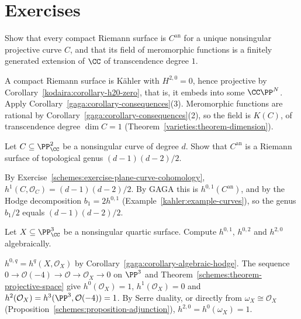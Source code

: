 \section{Exercises}\label{gaga:section-exercises}

\begin{exercise}\label{gaga:exercise-riemann-surfaces-algebraic}
Show that every compact Riemann surface is $C^{\mathrm{an}}$ for a unique nonsingular projective curve $C$, and that its field of meromorphic functions is a finitely
generated extension of $\CC$ of transcendence degree $1$.
\end{exercise}

\begin{solution}
A compact Riemann surface is K\"ahler with $H^{2,0} = 0$, hence projective by Corollary~\ref{kodaira:corollary-h20-zero}, that is, it embeds into some $\CC\PP^N$.
Apply Corollary~\ref{gaga:corollary-consequences}(3). Meromorphic functions are rational by Corollary~\ref{gaga:corollary-consequences}(2), so the field is $K(C)$, of
transcendence degree $\dim C = 1$ (Theorem~\ref{varieties:theorem-dimension}).
\end{solution}

\begin{exercise}\label{gaga:exercise-genus-plane-curve}
Let $C \subseteq \PP^2_\CC$ be a nonsingular curve of degree $d$. Show that $C^{\mathrm{an}}$ is a Riemann surface of topological genus $(d-1)(d-2)/2$.
\end{exercise}

\begin{solution}
By Exercise~\ref{schemes:exercise-plane-curve-cohomology}, $h^1(C, \mathcal{O}_C) = (d-1)(d-2)/2$. By GAGA this is $h^{0,1}(C^{\mathrm{an}})$, and by the Hodge
decomposition $b_1 = 2h^{0,1}$ (Example~\ref{kahler:example-curves}), so the genus $b_1/2$ equals $(d-1)(d-2)/2$.
\end{solution}

\begin{exercise}\label{gaga:exercise-hodge-numbers-hypersurface}
Let $X \subseteq \PP^3_\CC$ be a nonsingular quartic surface. Compute $h^{0,1}$, $h^{0,2}$ and $h^{2,0}$ algebraically.
\end{exercise}

\begin{solution}
$h^{0,q} = h^q(X, \mathcal{O}_X)$ by Corollary~\ref{gaga:corollary-algebraic-hodge}. The sequence $0 \to \mathcal{O}(-4) \to \mathcal{O} \to \mathcal{O}_X \to 0$ on $\PP^3$ and
Theorem~\ref{schemes:theorem-projective-space} give $h^0(\mathcal{O}_X) = 1$, $h^1(\mathcal{O}_X) = 0$ and $h^2(\mathcal{O}_X) = h^3(\PP^3, \mathcal{O}(-4)) = 1$. By
Serre duality, or directly from $\omega_X \cong \mathcal{O}_X$ (Proposition~\ref{schemes:proposition-adjunction}), $h^{2,0} = h^0(\omega_X) = 1$.
\end{solution}
